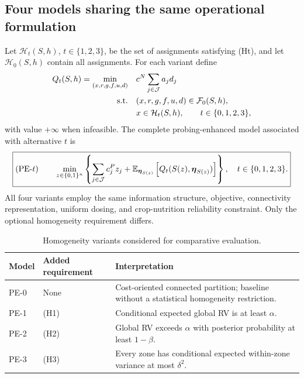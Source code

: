 \subsection{Four models sharing the same operational formulation}
\label{subsec:variants}

Let $\mathcal H_t(S,h)$, $t\in\{1,2,3\}$, be the set of assignments
satisfying (Ht), and let $\mathcal H_0(S,h)$ contain all assignments.
For each variant define
\begin{equation}
\begin{aligned}
 Q_t(S,h)=\min_{(x,r,g,f,u,d)}\quad
    &c^N\sum_{j\in\mathcal{J}}a_jd_j\\
 \text{s.t.}\quad &(x,r,g,f,u,d)\in\mathcal F_0(S,h),\\
                 &x\in\mathcal H_t(S,h),
 \qquad t\in\{0,1,2,3\},
\end{aligned}
\label{eq:recourse-variants}
\end{equation}
with value $+\infty$ when infeasible. The complete probing-enhanced
model associated with alternative $t$ is
\begin{equation}
 \boxed{\displaystyle
 (\mathrm{PE}\text{-}t)\qquad
 \min_{z\in\{0,1\}^{n}}
 \left\{\sum_{j\in\mathcal{J}}c_j^P z_j
 +\mathbb{E}_{\boldsymbol\eta_{S(z)}}\left[
     Q_t(S(z),\boldsymbol\eta_{S(z)})\right]\right\},
 \quad t\in\{0,1,2,3\}.}
 \label{eq:four-models}
\end{equation}
All four variants employ the same information structure, objective,
connectivity representation, uniform dosing, and crop-nutrition
reliability constraint. Only the optional homogeneity requirement differs.

\begin{table}[htbp]
\centering
\caption{Homogeneity variants considered for comparative evaluation.}
\label{tab:variants}
\small
\renewcommand{\arraystretch}{1.2}
\begin{tabularx}{\linewidth}{@{}l l X@{}}
\toprule
Model & Added requirement & Interpretation \\
\midrule
PE-0 & None & Cost-oriented connected partition; baseline without a statistical homogeneity restriction. \\
PE-1 & (H1) & Conditional expected global RV is at least $\alpha$. \\
PE-2 & (H2) & Global RV exceeds $\alpha$ with posterior probability at least $1-\beta$. \\
PE-3 & (H3) & Every zone has conditional expected within-zone variance at most $\delta^2$. \\
\bottomrule
\end{tabularx}
\end{table}

